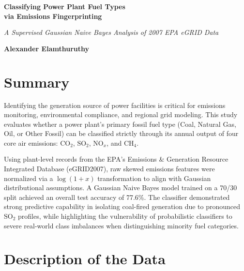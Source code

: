 \documentclass[
]{article}
\author{}
\date{\vspace{-2.5em}}
\begin{document}
\begin{titlepage}
\centering
\vspace*{\fill}

{\fontsize{24pt}{28pt}\selectfont \textbf{Classifying Power Plant Fuel Types\\[0.3em] via Emissions Fingerprinting}}

\vspace{1.5em}

{\large \textit{A Supervised Gaussian Naive Bayes Analysis of 2007 EPA eGRID Data}}

\vspace{3em}

{\Large \textbf{Alexander Elamthuruthy}}

\vspace*{\fill}
\end{titlepage}

\newpage
{}
\setcounter{page}{1}

\section{Summary}\label{summary}

Identifying the generation source of power facilities is critical for
emissions monitoring, environmental compliance, and regional grid
modeling. This study evaluates whether a power plant's primary fossil
fuel type (Coal, Natural Gas, Oil, or Other Fossil) can be classified
strictly through its annual output of four core air emissions:
\(\text{CO}_2\), \(\text{SO}_2\), \(\text{NO}_x\), and \(\text{CH}_4\).

Using plant-level records from the EPA's Emissions \& Generation
Resource Integrated Database (eGRID2007), raw skewed emissions features
were normalized via a \(\log(1 + x)\) transformation to align with
Gaussian distributional assumptions. A Gaussian Naive Bayes model
trained on a 70/30 split achieved an overall test accuracy of 77.6\%.
The classifier demonstrated strong predictive capability in isolating
coal-fired generation due to pronounced \(\text{SO}_2\) profiles, while
highlighting the vulnerability of probabilistic classifiers to severe
real-world class imbalances when distinguishing minority fuel
categories.

\section{Description of the Data}\label{description-of-the-data}
\end{document}
